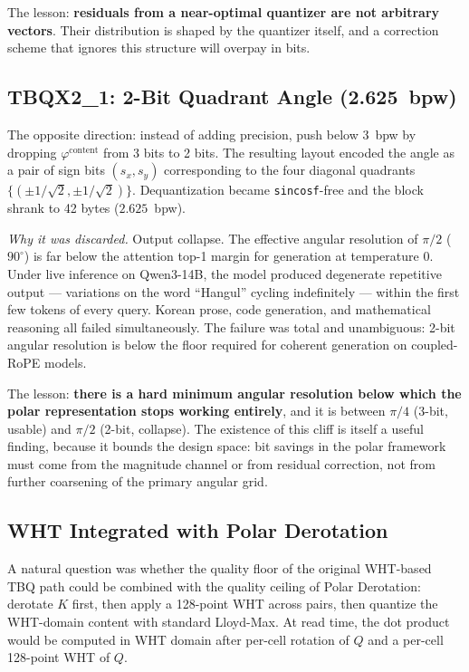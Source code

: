 \documentclass[10pt,twocolumn]{article}
\begin{document}
The lesson: \textbf{residuals from a near-optimal quantizer are not arbitrary vectors}. Their distribution is shaped by the quantizer itself, and a correction scheme that ignores this structure will overpay in bits.

\subsection{TBQX2\_1: 2-Bit Quadrant Angle (2.625~bpw)}

The opposite direction: instead of adding precision, push below 3~bpw by dropping $\varphi^{\text{content}}$ from 3 bits to 2 bits. The resulting layout encoded the angle as a pair of sign bits $(s_x, s_y)$ corresponding to the four diagonal quadrants $\{(\pm 1/\sqrt{2},\pm 1/\sqrt{2})\}$. Dequantization became \texttt{sincosf}-free and the block shrank to 42 bytes ($2.625$~bpw).

\emph{Why it was discarded.} Output collapse. The effective angular resolution of $\pi/2$ ($90^\circ$) is far below the attention top-1 margin for generation at temperature $0$. Under live inference on Qwen3-14B, the model produced degenerate repetitive output --- variations on the word ``Hangul'' cycling indefinitely --- within the first few tokens of every query. Korean prose, code generation, and mathematical reasoning all failed simultaneously. The failure was total and unambiguous: 2-bit angular resolution is below the floor required for coherent generation on coupled-RoPE models.

The lesson: \textbf{there is a hard minimum angular resolution below which the polar representation stops working entirely}, and it is between $\pi/4$ (3-bit, usable) and $\pi/2$ (2-bit, collapse). The existence of this cliff is itself a useful finding, because it bounds the design space: bit savings in the polar framework must come from the magnitude channel or from residual correction, not from further coarsening of the primary angular grid.

\subsection{WHT Integrated with Polar Derotation}

A natural question was whether the quality floor of the original WHT-based TBQ path could be combined with the quality ceiling of Polar Derotation: derotate $K$ first, then apply a 128-point WHT across pairs, then quantize the WHT-domain content with standard Lloyd-Max. At read time, the dot product would be computed in WHT domain after per-cell rotation of $Q$ and a per-cell 128-point WHT of $Q$.
\end{document}

